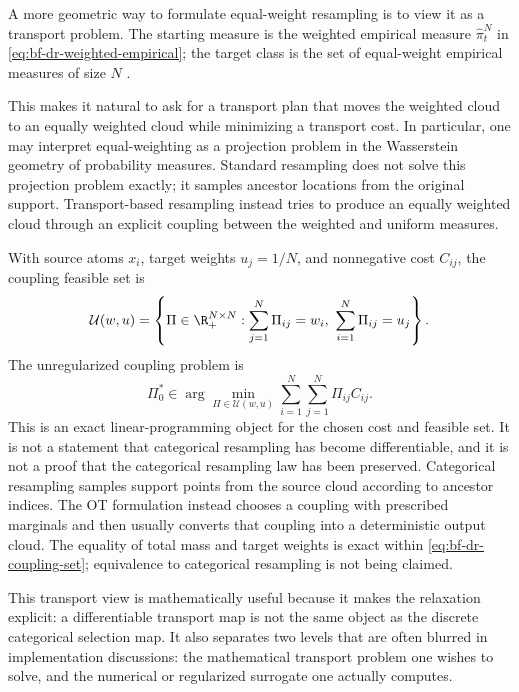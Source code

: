 A more geometric way to formulate equal-weight resampling is to view it as a
transport problem.  The starting measure is the weighted empirical measure
$\hat \pi_t^N$ in \eqref{eq:bf-dr-weighted-empirical}; the target class is the
set of equal-weight empirical measures of size $N$
\citep{villani2003topics,reich2013nonparametric}.

This makes it natural to ask for a transport plan that moves the weighted cloud
to an equally weighted cloud while minimizing a transport cost.  In particular,
one may interpret equal-weighting as a projection problem in the Wasserstein
geometry of probability measures.  Standard resampling does not solve this
projection problem exactly; it samples ancestor locations from the original
support.  Transport-based resampling instead tries to produce an equally
weighted cloud through an explicit coupling between the weighted and uniform
measures.

With source atoms $x_i$, target weights $u_j=1/N$, and nonnegative cost
$C_{ij}$, the coupling feasible set is
\begin{equation}
\label{eq:bf-dr-coupling-set}
  \mathcal U(w,u)
  =
  \left\{
    \Pi\in\R_+^{N\times N}:
    \sum_{j=1}^N \Pi_{ij}=w_i,\ 
    \sum_{i=1}^N \Pi_{ij}=u_j
  \right\}.
\end{equation}
The unregularized coupling problem is
\begin{equation}
\label{eq:bf-dr-unregularized-ot}
  \Pi_0^*
  \in
  \arg\min_{\Pi \in \mathcal U(w,u)}
  \sum_{i=1}^N\sum_{j=1}^N \Pi_{ij} C_{ij}.
\end{equation}
This is an exact linear-programming object for the chosen cost and feasible set.
It is not a statement that categorical resampling has become differentiable, and
it is not a proof that the categorical resampling law has been preserved.
Categorical resampling samples support points from the source cloud according to
ancestor indices.  The OT formulation instead chooses a coupling with prescribed
marginals and then usually converts that coupling into a deterministic output
cloud.  The equality of total mass and target weights is exact within
\eqref{eq:bf-dr-coupling-set}; equivalence to categorical resampling is not
being claimed.

This transport view is mathematically useful because it makes the relaxation
explicit: a differentiable transport map is not the same object as the discrete
categorical selection map.  It also separates two levels that are often blurred
in implementation discussions: the mathematical transport problem one wishes to
solve, and the numerical or regularized surrogate one actually computes.

